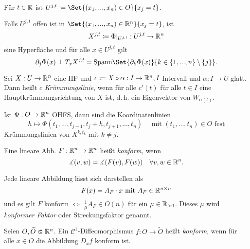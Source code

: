 \documentclass{cheat-sheet}
\begin{document}
\begin{nota}
  Für $t \in \mathbb{R}$ ist $U^{j,t} \coloneqq \Set{ (x_1, ..., x_n) \in O }{ x_j = t }$.
\end{nota}

\begin{bem}
  Falls $U^{j,t}$ offen ist in $\Set{ (x_1, ..., x_n) \in \R^n }{ x_j = t }$, ist
  \[ X^{j,t} \coloneqq \Phi|_{U^{j,t}} : U^{j,t} \to \mathbb{R}^n \]
  eine Hyperfläche und für alle $x \in U^{j,t}$ gilt
  \[ \partial_j \Phi(x) \perp T_x X^{j,t} = \mathrm{Spann} \Set{ \partial_k \Phi(x) }{ k \in \{ 1, ..., n \} \setminus \{ j \} }. \]
\end{bem}

\begin{defn}
  Sei $X : U \to \mathbb{R}^n$ eine HF und $c \coloneqq X \circ \alpha : I \to \mathbb{R}^n, I$ Intervall und $\alpha : I \to U$ glatt. Dann heißt $c$ \emph{Krümmungslinie}, wenn für alle $c'(t)$ für alle $t \in I$ eine Hauptkrümmungsrichtung von $X$ ist, d.\,h. ein Eigenvektor von $W_{\alpha(t)}$.
\end{defn}

\begin{satz}
  Ist $\Phi : O \to \mathbb{R}^n$ OHFS, dann sind die Koordinatenlinien
  \[ h \mapsto \Phi(t_1, ..., t_{j-1}, t_j + h, t_{j+1}, ..., t_n) \quad \text{ mit } (t_1, ..., t_n) \in O \text{ fest} \]
  Krümmungslinien von $X^{k, t_k}$ mit $k \not= j$.
\end{satz}

\begin{defn}
  Eine lineare Abb. $F : \mathbb{R}^n \to \mathbb{R}^n$ heißt \emph{konform}, wenn
  \[ \measuredangle (v, w) = \measuredangle (F(v), F(w)) \quad \forall v, w \in \mathbb{R}^n. \]
\end{defn}

\begin{bem}
  Jede lineare Abbildung lässt sich darstellen als
  \[ F(x) = A_F \cdot x \text{ mit } A_F \in \mathbb{R}^{n \times n} \]
  und es gilt $F$ konform $\iff$ $\tfrac{1}{\mu} A_F \in O(n)$ für ein $\mu \in \mathbb{R}_{> 0}$. Dieses $\mu$ wird \emph{konformer Faktor} oder Streckungsfaktor genannt.
\end{bem}

\begin{defn}
  Seien $O, \widetilde{O} \opn \R^n$. Ein $\mathcal{C}^1$-Diffeomorphismus $f : O \to \widetilde{O}$ heißt \emph{konform}, wenn für alle $x \in O$ die Abbildung $D_x f$ konform ist.
\end{defn}
\end{document}
